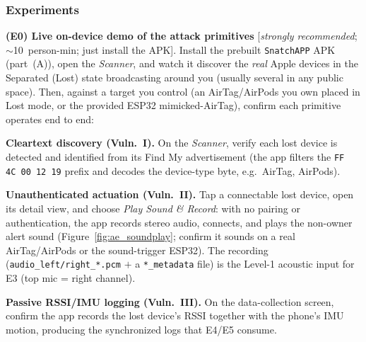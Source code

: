 \documentclass[nonacm,sigconf]{acmart}
\begin{document}
\subsubsection{Experiments}

\noindent\textbf{(E0) Live on-device demo of the attack primitives}
[\emph{strongly recommended}; $\sim$10~person-min; just install the APK].
Install the prebuilt \texttt{SnatchAPP} APK (part~(A)), open the
\textit{Scanner}, and watch it discover the \emph{real} Apple devices in the
Separated (Lost) state broadcasting around you (usually several in any public
space). Then,
against a target you control (an AirTag/AirPods you own placed in Lost mode, or
the provided ESP32 mimicked-AirTag), confirm each primitive operates end to end:
\begin{compactenum}
  \item \textbf{Cleartext discovery (Vuln.~I).} On the \textit{Scanner}, verify
        each lost device is detected and identified from its Find My advertisement
        (the app filters the \texttt{FF\,4C\,00\,12\,19} prefix and decodes the
        device-type byte, e.g.\ AirTag, AirPods).
  \item \textbf{Unauthenticated actuation (Vuln.~II).} Tap a connectable lost
        device, open its detail view, and choose \emph{Play Sound \& Record}: with
        no pairing or authentication, the app records stereo audio, connects, and
        plays the non-owner alert sound (Figure~\ref{fig:ae_soundplay}; confirm it
        sounds on a real AirTag/AirPods or the sound-trigger ESP32). The recording
        (\texttt{audio\_left/right\_*.pcm} $+$ a \texttt{*\_metadata} file) is the
        Level-1 acoustic input for E3 (top mic = right channel).
  \item \textbf{Passive RSSI/IMU logging (Vuln.~III).} On the data-collection
        screen, confirm the app records the lost device's RSSI together with the
        phone's IMU motion, producing the synchronized logs that E4/E5 consume.
\end{compactenum}
\end{document}
